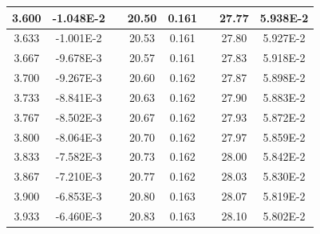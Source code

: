 \documentclass[article,12pt]{elsarticle}
\begin{document}
\begin{longtable}[c]{|c|c|cccccc}
3.600    & -1.048E-2 & \multicolumn{1}{c|}{} & \multicolumn{1}{c|}{20.50}   & \multicolumn{1}{c|}{0.161} & \multicolumn{1}{c|}{} & \multicolumn{1}{c|}{27.77}   & \multicolumn{1}{c|}{5.938E-2} \\ \hline
3.633    & -1.001E-2 & \multicolumn{1}{c|}{} & \multicolumn{1}{c|}{20.53}   & \multicolumn{1}{c|}{0.161} & \multicolumn{1}{c|}{} & \multicolumn{1}{c|}{27.80}   & \multicolumn{1}{c|}{5.927E-2} \\ \hline
3.667    & -9.678E-3 & \multicolumn{1}{c|}{} & \multicolumn{1}{c|}{20.57}   & \multicolumn{1}{c|}{0.161} & \multicolumn{1}{c|}{} & \multicolumn{1}{c|}{27.83}   & \multicolumn{1}{c|}{5.918E-2} \\ \hline
3.700    & -9.267E-3 & \multicolumn{1}{c|}{} & \multicolumn{1}{c|}{20.60}   & \multicolumn{1}{c|}{0.162} & \multicolumn{1}{c|}{} & \multicolumn{1}{c|}{27.87}   & \multicolumn{1}{c|}{5.898E-2} \\ \hline
3.733    & -8.841E-3 & \multicolumn{1}{c|}{} & \multicolumn{1}{c|}{20.63}   & \multicolumn{1}{c|}{0.162} & \multicolumn{1}{c|}{} & \multicolumn{1}{c|}{27.90}   & \multicolumn{1}{c|}{5.883E-2} \\ \hline
3.767    & -8.502E-3 & \multicolumn{1}{c|}{} & \multicolumn{1}{c|}{20.67}   & \multicolumn{1}{c|}{0.162} & \multicolumn{1}{c|}{} & \multicolumn{1}{c|}{27.93}   & \multicolumn{1}{c|}{5.872E-2} \\ \hline
3.800    & -8.064E-3 & \multicolumn{1}{c|}{} & \multicolumn{1}{c|}{20.70}   & \multicolumn{1}{c|}{0.162} & \multicolumn{1}{c|}{} & \multicolumn{1}{c|}{27.97}   & \multicolumn{1}{c|}{5.859E-2} \\ \hline
3.833    & -7.582E-3 & \multicolumn{1}{c|}{} & \multicolumn{1}{c|}{20.73}   & \multicolumn{1}{c|}{0.162} & \multicolumn{1}{c|}{} & \multicolumn{1}{c|}{28.00}   & \multicolumn{1}{c|}{5.842E-2} \\ \hline
3.867    & -7.210E-3 & \multicolumn{1}{c|}{} & \multicolumn{1}{c|}{20.77}   & \multicolumn{1}{c|}{0.162} & \multicolumn{1}{c|}{} & \multicolumn{1}{c|}{28.03}   & \multicolumn{1}{c|}{5.830E-2} \\ \hline
3.900    & -6.853E-3 & \multicolumn{1}{c|}{} & \multicolumn{1}{c|}{20.80}   & \multicolumn{1}{c|}{0.163} & \multicolumn{1}{c|}{} & \multicolumn{1}{c|}{28.07}   & \multicolumn{1}{c|}{5.819E-2} \\ \hline
3.933    & -6.460E-3 & \multicolumn{1}{c|}{} & \multicolumn{1}{c|}{20.83}   & \multicolumn{1}{c|}{0.163} & \multicolumn{1}{c|}{} & \multicolumn{1}{c|}{28.10}   & \multicolumn{1}{c|}{5.802E-2} \\ \hline

\end{longtable}
\end{document}
